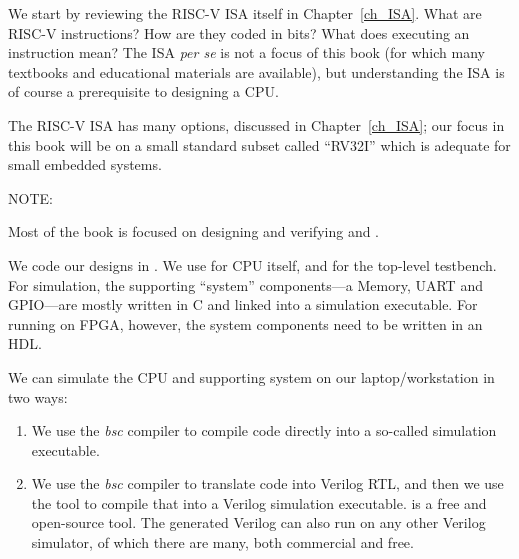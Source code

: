 We start by reviewing the RISC-V ISA itself in Chapter~\ref{ch_ISA}.
What are RISC-V instructions? How are they coded in bits? What does
executing an instruction mean?  The ISA \emph{per se} is not a focus
of this book (for which many textbooks and educational materials are
available), but understanding the ISA is of course a prerequisite to
designing a CPU.

The RISC-V ISA has many options, discussed in Chapter~\ref{ch_ISA};
our focus in this book will be on a small standard subset called
``RV32I'' which is adequate for small embedded systems.


\vspace{1ex}

NOTE: 

\vspace{1ex}


Most of the book is focused on designing and verifying {\DRUM} and {\FIFE}.

We code our designs in {\BSV}.  We use {\BSV} for CPU itself, and for
the top-level testbench.  For simulation, the supporting ``system''
components---a Memory, UART and GPIO---are mostly written in C and
linked into a simulation executable.  For running on FPGA, however,
the system components need to be written in an HDL.

We can simulate the CPU and supporting system on our
laptop/workstation in two ways:

\begin{enumerate}

 \item We use the \emph{bsc} compiler to compile {\BSV} code directly
       into a so-called {\BLUESIM} simulation executable.

 \item We use the \emph{bsc} compiler to translate {\BSV} code into
       Verilog RTL, and then we use the {\Verilator} tool to compile
       that into a Verilog simulation executable. {\Verilator} is a
       free and open-source tool.  The generated Verilog can also run
       on any other Verilog simulator, of which there are many, both
       commercial and free.

\end{enumerate}

